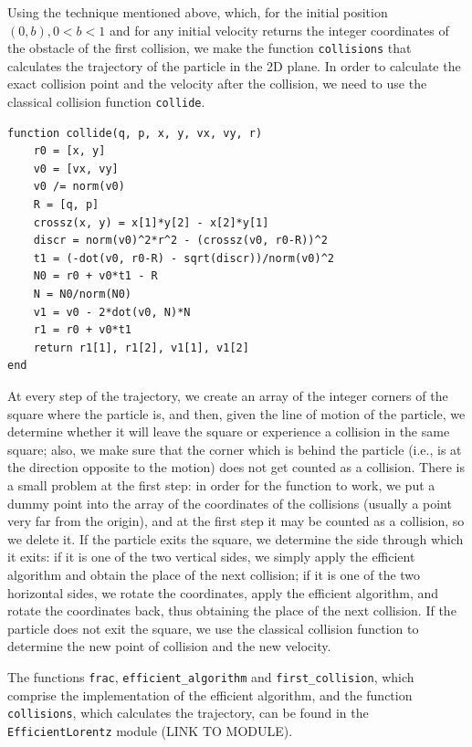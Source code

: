 \documentclass[prl,amsmath,amssymb, twocolumn, showpacs]{revtex4-1}
\begin{document}
Using the technique mentioned above, which, for the initial position $(0, b), 0 < b < 1$ and for any initial velocity returns the integer coordinates of the obstacle of the first collision, we make the function \texttt{collisions} that calculates the trajectory of the particle in the 2D plane. In order to calculate the exact collision point and the velocity after the collision, we need to use the classical collision function \texttt{collide}.

\begin{verbatim}
function collide(q, p, x, y, vx, vy, r)
    r0 = [x, y]
    v0 = [vx, vy]
    v0 /= norm(v0)
    R = [q, p]
    crossz(x, y) = x[1]*y[2] - x[2]*y[1]
    discr = norm(v0)^2*r^2 - (crossz(v0, r0-R))^2
    t1 = (-dot(v0, r0-R) - sqrt(discr))/norm(v0)^2
    N0 = r0 + v0*t1 - R
    N = N0/norm(N0)
    v1 = v0 - 2*dot(v0, N)*N
    r1 = r0 + v0*t1
    return r1[1], r1[2], v1[1], v1[2]
end
\end{verbatim}

At every step of the trajectory, we create an array of the integer corners of the square where the particle is, and then, given the line of motion of the particle, we determine whether it will leave the square or experience a collision in the same square; also, we make sure that the corner which is behind the particle (i.e., is at the direction opposite to the motion) does not get counted as a collision. There is a small problem at the first step: in order for the function to work, we put a dummy point into the array of the coordinates of the collisions (usually a point very far from the origin), and at the first step it may be counted as a collision, so we delete it. If the particle exits the square, we determine the side through which it exits: if it is one of the two vertical sides, we simply apply the efficient algorithm and obtain the place of the next collision; if it is one of the two horizontal sides, we rotate the coordinates, apply the efficient algorithm, and rotate the coordinates back, thus obtaining the place of the next collision. If the particle does not exit the square, we use the classical collision function to determine the new point of collision and the new velocity.

The functions \texttt{frac}, \texttt{efficient\_algorithm} and \texttt{first\_collision}, which comprise the implementation of the efficient algorithm, and the function \texttt{collisions}, which calculates the trajectory, can be found in the \texttt{EfficientLorentz} module (LINK TO MODULE).
\end{document}
